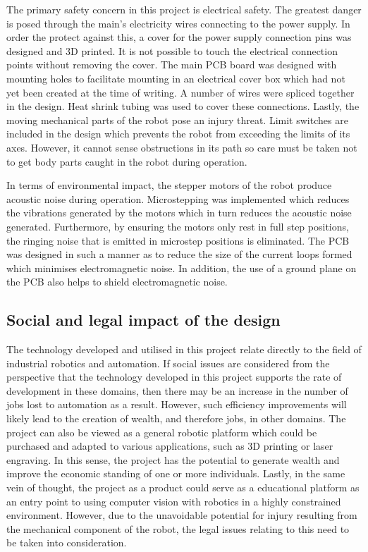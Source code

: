 The primary safety concern in this project is electrical safety. The greatest danger is posed through the main's electricity wires connecting to the power supply. In order the protect against this, a cover for the power supply connection pins was designed and 3D printed. It is not possible to touch the electrical connection points without removing the cover. The main PCB board was designed with mounting holes to facilitate mounting in an electrical cover box which had not yet been created at the time of writing. A number of wires were spliced together in the design. Heat shrink tubing was used to cover these connections. Lastly, the moving mechanical parts of the robot pose an injury threat. Limit switches are included in the design which prevents the robot from exceeding the limits of its axes. However, it cannot sense obstructions in its path so care must be taken not to get body parts caught in the robot during operation.

In terms of environmental impact, the stepper motors of the robot produce acoustic noise during operation. Microstepping was implemented which reduces the vibrations generated by the motors which in turn reduces the acoustic noise generated. Furthermore, by ensuring the motors only rest in full step positions, the ringing noise that is emitted in microstep positions is eliminated. The PCB was designed in such a manner as to reduce the size of the current loops formed which minimises electromagnetic noise. In addition, the use of a ground plane on the PCB also helps to shield electromagnetic noise.

\subsection{Social and legal impact of the design}

The technology developed and utilised in this project relate directly to the field of industrial robotics and automation. If social issues are considered from the perspective that the technology developed in this project supports the rate of development in these domains, then there may be an increase in the number of jobs lost to automation as a result. However, such efficiency improvements will likely lead to the creation of wealth, and therefore jobs, in other domains. The project can also be viewed as a general robotic platform which could be purchased and adapted to various applications, such as 3D printing or laser engraving. In this sense, the project has the potential to generate wealth and improve the economic standing of one or more individuals. Lastly, in the same vein of thought, the project as a product could serve as a educational platform as an entry point to using computer vision with robotics in a highly constrained environment. However, due to the unavoidable potential for injury resulting from the mechanical component of the robot, the legal issues relating to this need to be taken into consideration.



\newpage



